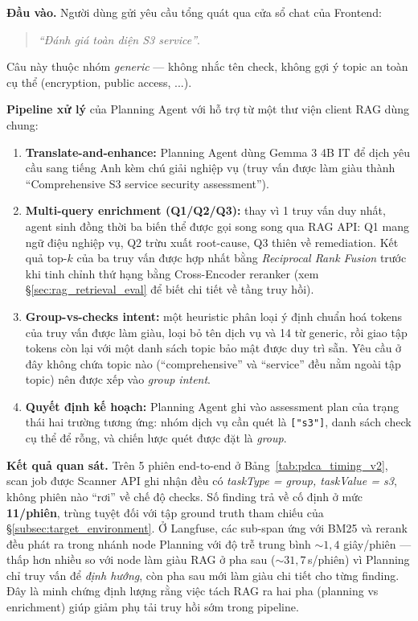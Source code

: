 \textbf{Đầu vào.} Người dùng gửi yêu cầu tổng quát qua cửa sổ chat của Frontend:
\begin{quote}
\textit{``Đánh giá toàn diện S3 service''}.
\end{quote}
Câu này thuộc nhóm \emph{generic} --- không nhắc tên check, không gợi ý topic an toàn cụ thể (encryption, public access, ...).

\textbf{Pipeline xử lý} của Planning Agent với hỗ trợ từ một thư viện client RAG dùng chung:
\begin{enumerate}
  \item \textbf{Translate-and-enhance:} Planning Agent dùng Gemma 3 4B IT để dịch yêu cầu sang tiếng Anh kèm chú giải nghiệp vụ (truy vấn được làm giàu thành ``Comprehensive S3 service security assessment'').
  \item \textbf{Multi-query enrichment (Q1/Q2/Q3):} thay vì 1 truy vấn duy nhất, agent sinh đồng thời ba biến thể được gọi song song qua RAG API: Q1 mang ngữ điệu nghiệp vụ, Q2 trừu xuất root-cause, Q3 thiên về remediation. Kết quả top-$k$ của ba truy vấn được hợp nhất bằng \textit{Reciprocal Rank Fusion} trước khi tinh chỉnh thứ hạng bằng Cross-Encoder reranker (xem \S\ref{sec:rag_retrieval_eval} để biết chi tiết về tầng truy hồi).
  \item \textbf{Group-vs-checks intent:} một heuristic phân loại ý định chuẩn hoá tokens của truy vấn được làm giàu, loại bỏ tên dịch vụ và 14 từ generic, rồi giao tập tokens còn lại với một danh sách topic bảo mật được duy trì sẵn. Yêu cầu ở đây không chứa topic nào (``comprehensive'' và ``service'' đều nằm ngoài tập topic) nên được xếp vào \emph{group intent}.
  \item \textbf{Quyết định kế hoạch:} Planning Agent ghi vào assessment plan của trạng thái hai trường tương ứng: nhóm dịch vụ cần quét là \texttt{["s3"]}, danh sách check cụ thể để rỗng, và chiến lược quét được đặt là \textit{group}.
\end{enumerate}

\textbf{Kết quả quan sát.} Trên 5 phiên end-to-end ở Bảng~\ref{tab:pdca_timing_v2}, scan job được Scanner API ghi nhận đều có \textit{taskType = group, taskValue = s3}, không phiên nào ``rơi'' về chế độ checks. Số finding trả về cố định ở mức \textbf{11/phiên}, trùng tuyệt đối với tập ground truth tham chiếu của \S\ref{subsec:target_environment}. Ở Langfuse, các sub-span ứng với BM25 và rerank đều phát ra trong nhánh node Planning với độ trễ trung bình $\sim 1{,}4$ giây/phiên --- thấp hơn nhiều so với node làm giàu RAG ở pha sau ($\sim 31{,}7\,$s/phiên) vì Planning chỉ truy vấn để \emph{định hướng}, còn pha sau mới làm giàu chi tiết cho từng finding. Đây là minh chứng định lượng rằng việc tách RAG ra hai pha (planning vs enrichment) giúp giảm phụ tải truy hồi sớm trong pipeline.

